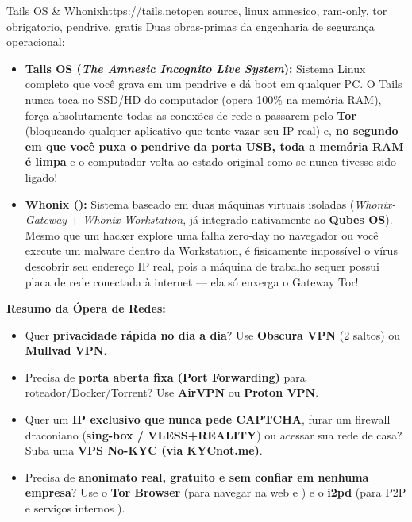 \documentclass{pousadaguide}
\begin{document}
\begin{ferramenta}[recomendado,logo=tails]{Tails OS \& Whonix}{https://tails.net}{open source, linux amnesico, ram-only, tor obrigatorio, pendrive, gratis}
Duas obras-primas da engenharia de segurança operacional:
\begin{itemize}
  \item \textbf{Tails OS (\emph{The Amnesic Incognito Live System}):} Sistema Linux completo que você grava em um pendrive e dá boot em qualquer PC. O Tails nunca toca no SSD/HD do computador (opera 100\% na memória RAM), força absolutamente todas as conexões de rede a passarem pelo \textbf{Tor} (bloqueando qualquer aplicativo que tente vazar seu IP real) e, \textbf{no segundo em que você puxa o pendrive da porta USB, toda a memória RAM é limpa} e o computador volta ao estado original como se nunca tivesse sido ligado!
  \item \textbf{Whonix ():} Sistema baseado em duas máquinas virtuais isoladas (\emph{Whonix-Gateway} + \emph{Whonix-Workstation}, já integrado nativamente ao \textbf{Qubes OS}). Mesmo que um hacker explore uma falha zero-day no navegador ou você execute um malware dentro da Workstation, é fisicamente impossível o vírus descobrir seu endereço IP real, pois a máquina de trabalho sequer possui placa de rede conectada à internet — ela só enxerga o Gateway Tor!
\end{itemize}
\end{ferramenta}

\begin{tldr}
\textbf{Resumo da Ópera de Redes:}
\begin{itemize}
  \item Quer \textbf{privacidade rápida no dia a dia}? Use \textbf{Obscura VPN} (2 saltos) ou \textbf{Mullvad VPN}.
  \item Precisa de \textbf{porta aberta fixa (Port Forwarding)} para roteador/Docker/Torrent? Use \textbf{AirVPN} ou \textbf{Proton VPN}.
  \item Quer um \textbf{IP exclusivo que nunca pede CAPTCHA}, furar um firewall draconiano (\textbf{sing-box / VLESS+REALITY}) ou acessar sua rede de casa? Suba uma \textbf{VPS No-KYC (via KYCnot.me)}.
  \item Precisa de \textbf{anonimato real, gratuito e sem confiar em nenhuma empresa}? Use o \textbf{Tor Browser} (para navegar na web e ) e o \textbf{i2pd} (para P2P e serviços internos ).
\end{itemize}
\end{tldr}
\end{document}
